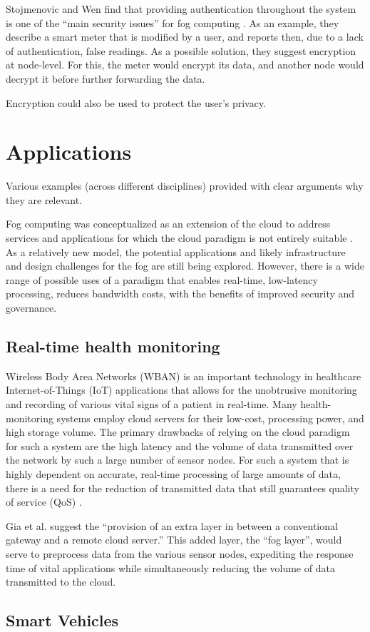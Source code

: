 \documentclass{article}
\begin{document}
Stojmenovic and Wen \cite{stojmenovic2014fog} find that providing authentication throughout the system is one of the ``main security issues'' for fog computing . As an example, they describe a smart meter that is modified by a user, and reports then, due to a lack of authentication, false readings. As a possible solution, they suggest encryption at node-level. For this, the meter would encrypt its data, and another node would decrypt it before further forwarding the data.

Encryption could also be used to protect the user's privacy.


\section{Applications}
Various examples (across different disciplines) provided with clear arguments why they are relevant.

Fog computing was conceptualized as an extension of the cloud to address services and applications for which the cloud paradigm is not entirely suitable \cite{bessis2014big}. As a relatively new model, the potential applications and likely infrastructure and design challenges for the fog are still being explored. However, there is a wide range of possible uses of a paradigm that enables real-time, low-latency processing, reduces bandwidth costs, with the benefits of improved security and governance.

\subsection{Real-time health monitoring}
Wireless Body Area Networks (WBAN) is an important technology in healthcare Internet-of-Things (IoT) applications that allows for the unobtrusive monitoring and recording of various vital signs of a patient in real-time. Many health-monitoring systems employ cloud servers for their low-cost, processing power, and high storage volume. The primary drawbacks of relying on the cloud paradigm for such a system are the high latency and the volume of data transmitted over the network by such a large number of sensor nodes. For such a system that is highly dependent on accurate, real-time processing of large amounts of data, there is a need for the reduction of transmitted data that still guarantees quality of service (QoS) \cite{gia2015fog}.

Gia et al. \cite{gia2015fog} suggest the “provision of an extra layer in between a conventional gateway and a remote cloud server.” This added layer, the “fog layer”, would serve to preprocess data from the various sensor nodes, expediting the response time of vital applications while simultaneously reducing the volume of data transmitted to the cloud.


\subsection{Smart Vehicles}


\renewcommand{\refname}{\section{References}}


\end{document}
